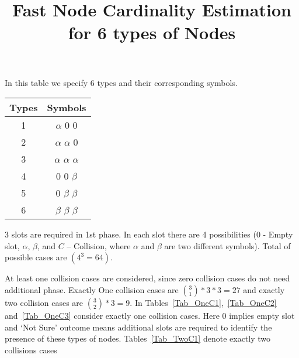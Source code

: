 \documentclass[fleqn]{article}
\begin{document}
\title{Fast Node Cardinality Estimation for 6 types of Nodes}

\maketitle{}

In this table we specify 6 types and their corresponding symbols. 
\begin{center}
  \begin{tabular}{| c | c |}
    \hline
    Types & Symbols \\ \hline
    1 & $\alpha$ $0$ $0$ \\ \hline
    2 & $\alpha$ $\alpha$ $0$ \\ \hline
    3 & $\alpha$ $\alpha$ $\alpha$ \\ \hline
    
    4 & $0$ $0$ $\beta$ \\ \hline
    5 & $0$ $\beta$ $\beta$ \\ \hline
    6 & $\beta$ $\beta$ $\beta$ \\ \hline
    
    \hline
  \end{tabular}
\end{center}

3 slots are required in 1st phase. In each slot there are 4 possibilities (0 - Empty slot,
$\alpha$, $\beta$, and $C$ – Collision, where $\alpha$ and $\beta$ are two different symbols). Total of possible cases are $(4^3 = 64)$. 
\par At least one collision cases are considered, since zero collision cases do not need additional phase. Exactly One collision cases are $\binom{3}{1}*3*3 = 27$ and exactly two collision cases are $\binom{3}{2}*3 = 9$. In Tables~\ref{Tab_OneC1},~\ref{Tab_OneC2} and~\ref{Tab_OneC3} consider exactly one collision cases. Here $0$ implies empty slot and `Not Sure' outcome means additional slots are required to identify the presence of these types of nodes. Tables~\ref{Tab_TwoC1} denote exactly two collisions cases
\end{document}
